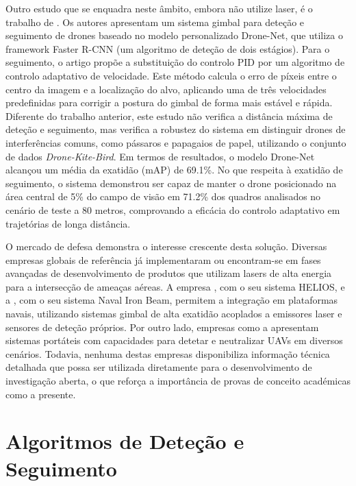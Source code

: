Outro estudo que se enquadra neste âmbito, embora não utilize laser, é o trabalho de \cite{camera_gimbal}. Os autores apresentam um sistema gimbal para deteção e seguimento de drones baseado no modelo personalizado Drone-Net, que utiliza o framework Faster R-CNN (um algoritmo de deteção de dois estágios). Para o seguimento, o artigo propõe a substituição do controlo PID por um algoritmo de controlo adaptativo de velocidade. Este método calcula o erro de píxeis entre o centro da imagem e a localização do alvo, aplicando uma de três velocidades predefinidas para corrigir a postura do gimbal de forma mais estável e rápida. Diferente do trabalho anterior, este estudo não verifica a distância máxima de deteção e seguimento, mas verifica a robustez do sistema em distinguir drones de interferências comuns, como pássaros e papagaios de papel, utilizando o conjunto de dados \emph{Drone-Kite-Bird}. Em termos de resultados, o modelo Drone-Net alcançou um média da exatidão (mAP) de 69.1\%. No que respeita à exatidão de seguimento, o sistema demonstrou ser capaz de manter o drone posicionado na área central de 5\% do campo de visão em 71.2\% dos quadros analisados no cenário de teste a 80 metros, comprovando a eficácia do controlo adaptativo em trajetórias de longa distância.

O mercado de defesa demonstra o interesse crescente desta solução. Diversas empresas globais de referência já implementaram ou encontram-se em fases avançadas de desenvolvimento de produtos que utilizam lasers de alta energia para a intersecção de ameaças aéreas. A empresa \cite{lockheed2021helios}, com o seu sistema HELIOS, e a \cite{rafael2023navalironbeam}, com o seu sistema Naval Iron Beam, permitem a integração em plataformas navais, utilizando sistemas gimbal de alta exatidão acoplados a emissores laser e sensores de deteção próprios. Por outro lado, empresas como a \cite{rtx2023hel} apresentam sistemas portáteis com capacidades para detetar e neutralizar UAVs em diversos cenários. Todavia, nenhuma destas empresas disponibiliza informação técnica detalhada que possa ser utilizada diretamente para o desenvolvimento de investigação aberta, o que reforça a importância de provas de conceito académicas como a presente.

\section{Algoritmos de Deteção e Seguimento}

